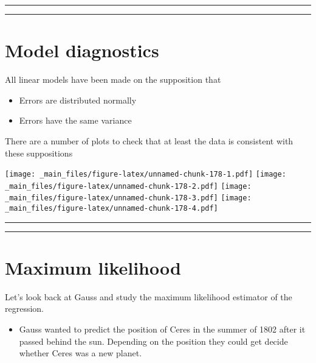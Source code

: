 \documentclass[
]{book}
\providecommand{\tightlist}{%
  \setlength{\itemsep}{0pt}\setlength{\parskip}{0pt}}
\begin{document}
\begin{center}\rule{0.5\linewidth}{0.5pt}\end{center}

\begin{center}\rule{0.5\linewidth}{0.5pt}\end{center}

\hypertarget{model-diagnostics}{%
\section{Model diagnostics}\label{model-diagnostics}}

All linear models have been made on the supposition that

\begin{itemize}
\item
  Errors are distributed normally
\item
  Errors have the same variance
\end{itemize}

There are a number of plots to check that at least the data is consistent with these suppositions

\texttt{[image: \_main\_files/figure-latex/unnamed-chunk-178-1.pdf]} \texttt{[image: \_main\_files/figure-latex/unnamed-chunk-178-2.pdf]} \texttt{[image: \_main\_files/figure-latex/unnamed-chunk-178-3.pdf]} \texttt{[image: \_main\_files/figure-latex/unnamed-chunk-178-4.pdf]}

\begin{center}\rule{0.5\linewidth}{0.5pt}\end{center}

\begin{center}\rule{0.5\linewidth}{0.5pt}\end{center}

\hypertarget{maximum-likelihood-3}{%
\section{Maximum likelihood}\label{maximum-likelihood-3}}

Let's look back at Gauss and study the maximum likelihood estimator of the regression.

\begin{itemize}
\tightlist
\item
  Gauss wanted to predict the position of Ceres in the summer of 1802 after it passed behind the sun. Depending on the position they could get decide whether Ceres was a new planet.
\end{itemize}
\end{document}
